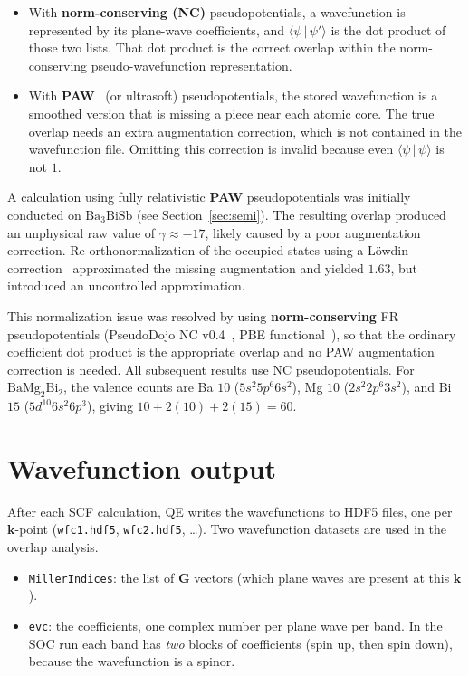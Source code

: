 \documentclass[11pt]{article}
\newcommand{\braket}[2]{\langle #1 \,\vert\, #2 \rangle}
\newcommand{\kk}{\mathbf{k}}
\newcommand{\GG}{\mathbf{G}}
\newcommand{\bmb}{\mathrm{BaMg_2Bi_2}}
\newcommand{\bath}{\mathrm{Ba_3BiSb}}
\begin{document}
\begin{itemize}[leftmargin=1.4em]
\item With \textbf{norm-conserving (NC)} pseudopotentials, a wavefunction is represented by its
plane-wave coefficients, and $\braket{\psi}{\psi'}$ is the dot product of those two lists.
That dot product is the correct overlap within the norm-conserving pseudo-wavefunction representation.
\item With \textbf{PAW}~\cite{blochl1994} (or ultrasoft) pseudopotentials, the stored wavefunction is a
smoothed version that is missing a piece near each atomic core. The true overlap needs an extra
augmentation correction, which is not contained in the wavefunction file. Omitting this correction
is invalid because even
$\braket{\psi}{\psi}$ is not $1$.
\end{itemize}

A calculation using fully relativistic \textbf{PAW} pseudopotentials was initially conducted on
$\bath$ (see Section~\ref{sec:semi}). The resulting overlap produced an unphysical raw value of
$\gamma\approx-17$, likely caused by a poor augmentation correction. Re-orthonormalization of the
occupied states using a L\"owdin correction~\cite{lowdin1950} approximated the missing augmentation
and yielded $1.63$, but introduced an uncontrolled approximation.

\begin{sloppypar}
This normalization issue was resolved by using \textbf{norm-conserving} FR pseudopotentials (PseudoDojo NC
v0.4~\cite{vansetten2018,hamann2013}, PBE functional~\cite{perdew1996}), so that the ordinary
coefficient dot product is the appropriate overlap and no PAW augmentation correction is needed.
All subsequent results use NC pseudopotentials. For $\bmb$, the valence counts are Ba $10$
($5s^2 5p^6 6s^2$), Mg $10$ ($2s^2 2p^6 3s^2$), and Bi $15$ ($5d^{10}6s^2 6p^3$), giving
$10 + 2(10) + 2(15) = 60$.
\end{sloppypar}

\section{Wavefunction output}\label{sec:disk}

After each SCF calculation, QE writes the wavefunctions to HDF5 files, one per $\kk$-point
(\texttt{wfc1.hdf5}, \texttt{wfc2.hdf5}, \dots). Two wavefunction datasets are used in the overlap analysis.
\begin{itemize}[leftmargin=1.4em,itemsep=1pt]
\item \texttt{MillerIndices}: the list of $\GG$ vectors (which plane waves are present at this $\kk$).
\item \texttt{evc}: the coefficients, one complex number per plane wave per band. In the SOC run each
band has \emph{two} blocks of coefficients (spin up, then spin down), because the wavefunction is a spinor.
\end{itemize}
\end{document}

